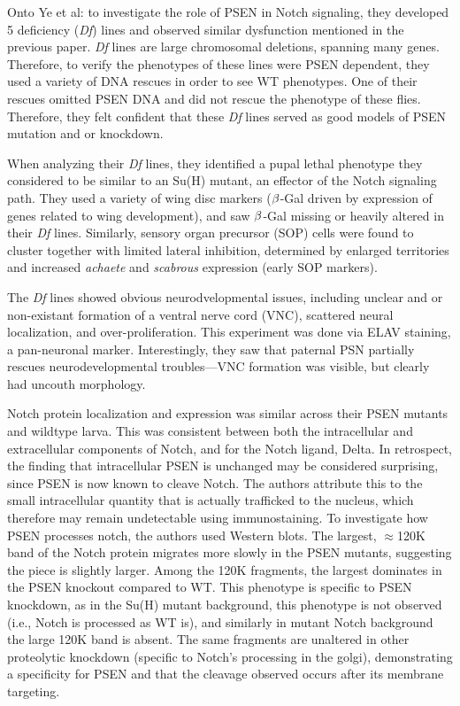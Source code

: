 Onto Ye et al: to investigate the role of PSEN in Notch signaling, they developed 5 deficiency (\textit{Df}) lines and observed similar dysfunction mentioned in the previous paper. \textit{Df} lines are large chromosomal deletions, spanning many genes. Therefore, to verify the phenotypes of these lines were PSEN dependent, they used a variety of DNA rescues in order to see WT phenotypes. One of their rescues omitted PSEN DNA and did not rescue the phenotype of these flies. Therefore, they felt confident that these \textit{Df} lines served as good models of PSEN mutation and or knockdown.\newline

When analyzing their \textit{Df} lines, they identified a pupal lethal phenotype they considered to be similar to an Su(H) mutant, an effector of the Notch signaling path. They used a variety of wing disc markers ($\beta$-Gal driven by expression of genes related to wing development), and saw $\beta$-Gal missing or heavily altered in their \textit{Df} lines. Similarly, sensory organ precursor (SOP) cells were found to cluster together with limited lateral inhibition, determined by enlarged territories and increased \textit{achaete} and \textit{scabrous} expression (early SOP markers).\newline

The \textit{Df} lines showed obvious neurodvelopmental issues, including unclear and or non-existant formation of a ventral nerve cord (VNC), scattered neural localization, and over-proliferation. This experiment was done via ELAV staining, a pan-neuronal marker. Interestingly, they saw that paternal PSN partially rescues neurodevelopmental troubles---VNC formation was visible, but clearly had uncouth morphology.\newline

Notch protein localization and expression was similar across their PSEN mutants and wildtype larva. This was consistent between both the intracellular and extracellular components of Notch, and for the Notch ligand, Delta. In retrospect, the finding that intracellular PSEN is unchanged may be considered surprising, since PSEN is now known to cleave Notch. The authors attribute this to the small intracellular quantity that is actually trafficked to the nucleus, which therefore may remain undetectable using immunostaining. To investigate how PSEN processes notch, the authors used Western blots. The largest, $\approx$120K band of the Notch protein migrates more slowly in the PSEN mutants, suggesting the piece is slightly larger. Among the 120K fragments, the largest dominates in the PSEN knockout compared to WT. This phenotype is specific to PSEN knockdown, as in the Su(H) mutant background, this phenotype is not observed (i.e., Notch is processed as WT is), and similarly in mutant Notch background the large 120K band is absent. The same fragments are unaltered in other proteolytic knockdown (specific to Notch's processing in the golgi), demonstrating a specificity for PSEN and that the cleavage observed occurs after its membrane targeting.\newline


